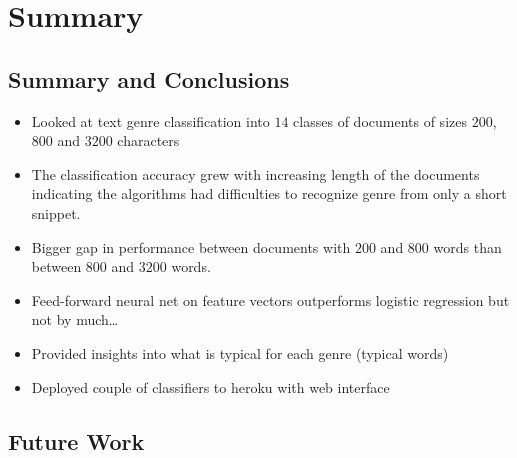 \chapter{Summary}

\section{Summary and Conclusions}

\begin{itemize}
    \item Looked at text genre classification into $14$ classes of documents of sizes $200$, $800$ and $3200$ characters
    \item The classification accuracy grew with increasing length of the documents indicating the algorithms had difficulties to recognize genre from only a short snippet.
    \item Bigger gap in performance between documents with $200$ and $800$ words than between $800$ and $3200$ words.
    \item Feed-forward neural net on feature vectors outperforms logistic regression but not by much\dots
    \item Provided insights into what is typical for each genre (typical words)
    \item Deployed couple of classifiers to heroku with web interface
\end{itemize}

\section{Future Work}
